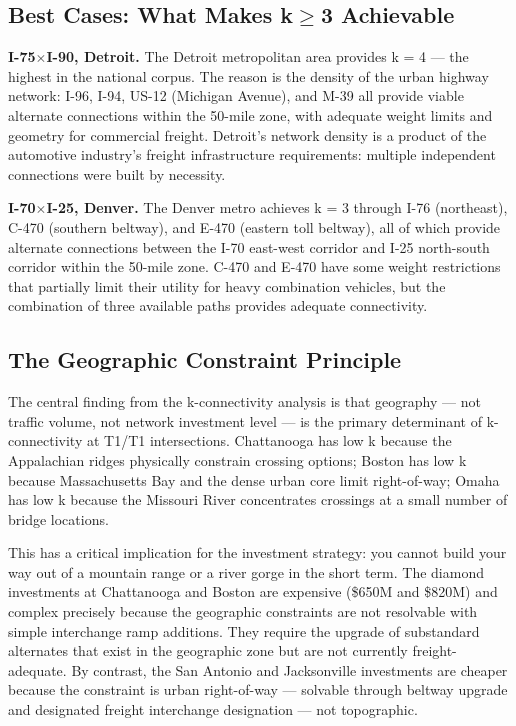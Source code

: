 \subsection{Best Cases: What Makes k$\geq$3 Achievable}

\textbf{I-75$\times$I-90, Detroit.} The Detroit metropolitan area provides k = 4 --- the highest in the national corpus. The reason is the density of the urban highway network: I-96, I-94, US-12 (Michigan Avenue), and M-39 all provide viable alternate connections within the 50-mile zone, with adequate weight limits and geometry for commercial freight. Detroit's network density is a product of the automotive industry's freight infrastructure requirements: multiple independent connections were built by necessity.

\textbf{I-70$\times$I-25, Denver.} The Denver metro achieves k = 3 through I-76 (northeast), C-470 (southern beltway), and E-470 (eastern toll beltway), all of which provide alternate connections between the I-70 east-west corridor and I-25 north-south corridor within the 50-mile zone. C-470 and E-470 have some weight restrictions that partially limit their utility for heavy combination vehicles, but the combination of three available paths provides adequate connectivity.

\subsection{The Geographic Constraint Principle}

The central finding from the k-connectivity analysis is that geography --- not traffic volume, not network investment level --- is the primary determinant of k-connectivity at T1/T1 intersections. Chattanooga has low k because the Appalachian ridges physically constrain crossing options; Boston has low k because Massachusetts Bay and the dense urban core limit right-of-way; Omaha has low k because the Missouri River concentrates crossings at a small number of bridge locations.

This has a critical implication for the investment strategy: you cannot build your way out of a mountain range or a river gorge in the short term. The diamond investments at Chattanooga and Boston are expensive (\$650M and \$820M) and complex precisely because the geographic constraints are not resolvable with simple interchange ramp additions. They require the upgrade of substandard alternates that exist in the geographic zone but are not currently freight-adequate. By contrast, the San Antonio and Jacksonville investments are cheaper because the constraint is urban right-of-way --- solvable through beltway upgrade and designated freight interchange designation --- not topographic.


